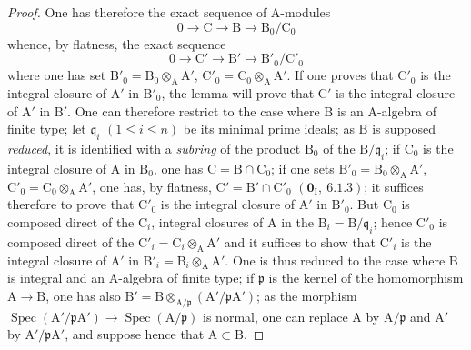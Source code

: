 \begin{proof}
One has therefore the exact sequence of $\mathrm{A}$-modules
\[
  0\to\mathrm{C}\to\mathrm{B}\to\mathrm{B}_0/\mathrm{C}_0
\]
whence, by flatness, the exact sequence
\[
  0\to\mathrm{C}'\to\mathrm{B}'\to\mathrm{B}'_0/\mathrm{C}'_0
\]
where one has set $\mathrm{B}'_0=\mathrm{B}_0\otimes_\mathrm{A}\mathrm{A}'$, $\mathrm{C}'_0=\mathrm{C}_0\otimes_\mathrm{A}\mathrm{A}'$. If one proves that $\mathrm{C}'_0$ is the integral
closure of $\mathrm{A}'$ in $\mathrm{B}'_0$, the lemma  will prove that $\mathrm{C}'$ is the integral
closure of $\mathrm{A}'$ in $\mathrm{B}'$. One can therefore restrict to the case where $\mathrm{B}$ is an $\mathrm{A}$-algebra of
finite type; let $\mathfrak{q}_i$ $(1\leqslant i\leqslant n)$ be its minimal prime ideals; as $\mathrm{B}$
is supposed \emph{reduced}, it is identified with a \emph{subring} of the product $\mathrm{B}_0$ of the $\mathrm{B}/\mathfrak{q}_i$; if $\mathrm{C}_0$ is the integral
closure of $\mathrm{A}$ in $\mathrm{B}_0$, one has $\mathrm{C}=\mathrm{B}\cap\mathrm{C}_0$; if one sets $\mathrm{B}'_0=\mathrm{B}_0\otimes_\mathrm{A}\mathrm{A}'$, $\mathrm{C}'_0=\mathrm{C}_0\otimes_\mathrm{A}\mathrm{A}'$, one has,
by flatness, $\mathrm{C}'=\mathrm{B}'\cap\mathrm{C}'_0$ $(\mathbf{0}_\mathrm{I},~6.1.3)$; it suffices therefore to prove that $\mathrm{C}'_0$ is the integral
closure of $\mathrm{A}'$ in $\mathrm{B}'_0$. But $\mathrm{C}_0$ is composed direct of the $\mathrm{C}_i$, integral closures of $\mathrm{A}$
in the $\mathrm{B}_i=\mathrm{B}/\mathfrak{q}_i$; hence $\mathrm{C}'_0$ is composed direct of the $\mathrm{C}'_i=\mathrm{C}_i\otimes_\mathrm{A}\mathrm{A}'$ and it suffices to show
that $\mathrm{C}'_i$ is the integral closure of $\mathrm{A}'$ in $\mathrm{B}'_i=\mathrm{B}_i\otimes_\mathrm{A}\mathrm{A}'$. One is thus reduced to the case
where $\mathrm{B}$ is integral and an $\mathrm{A}$-algebra of finite type; if $\mathfrak{p}$ is the kernel of the homomorphism $\mathrm{A}\to\mathrm{B}$,
one has also $\mathrm{B}'=\mathrm{B}\otimes_{\mathrm{A}/\mathfrak{p}}(\mathrm{A}'/\mathfrak{p}\mathrm{A}')$; as the morphism $\operatorname{Spec}(\mathrm{A}'/\mathfrak{p}\mathrm{A}')\to\operatorname{Spec}(\mathrm{A}/\mathfrak{p})$ is
normal, one can replace $\mathrm{A}$ by $\mathrm{A}/\mathfrak{p}$ and $\mathrm{A}'$ by $\mathrm{A}'/\mathfrak{p}\mathrm{A}'$, and suppose hence
that $\mathrm{A}\subset\mathrm{B}$.



\end{proof}
